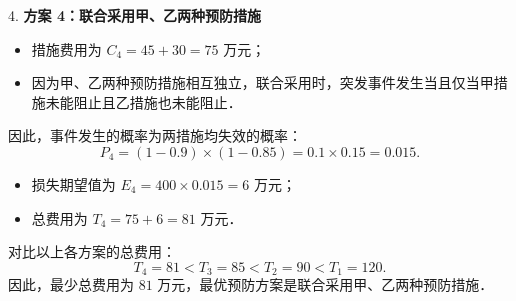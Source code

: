 \begin{answer}
4. \textbf{方案 4：联合采用甲、乙两种预防措施}
\begin{itemize}
\item 措施费用为 $C_4 = 45 + 30 = 75$ 万元；
\item 因为甲、乙两种预防措施相互独立，联合采用时，突发事件发生当且仅当甲措施未能阻止且乙措施也未能阻止．
\end{itemize}
     因此，事件发生的概率为两措施均失效的概率：
\nopagebreak[4]
\[
P_4 = (1 - 0.9) \times (1 - 0.85) = 0.1 \times 0.15 = 0.015.
\]
\begin{itemize}
\item 损失期望值为 $E_4 = 400 \times 0.015 = 6$ 万元；
\item 总费用为 $T_4 = 75 + 6 = 81$ 万元．
\end{itemize}

对比以上各方案的总费用：
\nopagebreak[4]
\[
T_4 = 81 < T_3 = 85 < T_2 = 90 < T_1 = 120.
\]
因此，最少总费用为 $81$ 万元，最优预防方案是联合采用甲、乙两种预防措施．


\end{answer}
